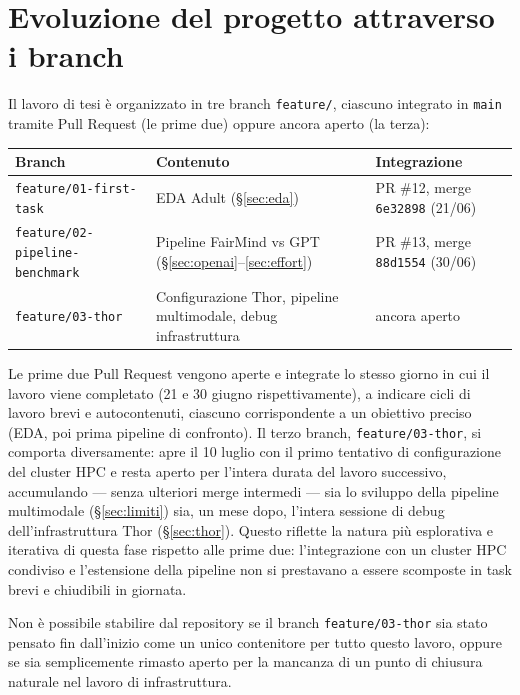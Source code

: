 \section{Evoluzione del progetto attraverso i branch}
\label{sec:branch}

Il lavoro di tesi è organizzato in tre branch \texttt{feature/}, ciascuno integrato in \texttt{main} tramite Pull Request (le prime due) oppure ancora aperto (la terza):

\begin{center}
\begin{tabular}{lll}
\toprule
Branch & Contenuto & Integrazione \\
\midrule
\texttt{feature/01-first-task} & EDA Adult (\S\ref{sec:eda}) & PR \#12, merge \texttt{6e32898} (21/06) \\
\texttt{feature/02-pipeline-benchmark} & Pipeline FairMind vs GPT (\S\ref{sec:openai}--\ref{sec:effort}) & PR \#13, merge \texttt{88d1554} (30/06) \\
\texttt{feature/03-thor} & Configurazione Thor, pipeline multimodale, debug infrastruttura & ancora aperto \\
\bottomrule
\end{tabular}
\end{center}

Le prime due Pull Request vengono aperte e integrate lo stesso giorno in cui il lavoro viene completato (21 e 30 giugno rispettivamente), a indicare cicli di lavoro brevi e autocontenuti, ciascuno corrispondente a un obiettivo preciso (EDA, poi prima pipeline di confronto). Il terzo branch, \texttt{feature/03-thor}, si comporta diversamente: apre il 10 luglio con il primo tentativo di configurazione del cluster HPC e resta aperto per l'intera durata del lavoro successivo, accumulando --- senza ulteriori merge intermedi --- sia lo sviluppo della pipeline multimodale (\S\ref{sec:limiti}) sia, un mese dopo, l'intera sessione di debug dell'infrastruttura Thor (\S\ref{sec:thor}). Questo riflette la natura più esplorativa e iterativa di questa fase rispetto alle prime due: l'integrazione con un cluster HPC condiviso e l'estensione della pipeline non si prestavano a essere scomposte in task brevi e chiudibili in giornata.

Non è possibile stabilire dal repository se il branch \texttt{feature/03-thor} sia stato pensato fin dall'inizio come un unico contenitore per tutto questo lavoro, oppure se sia semplicemente rimasto aperto per la mancanza di un punto di chiusura naturale nel lavoro di infrastruttura.
